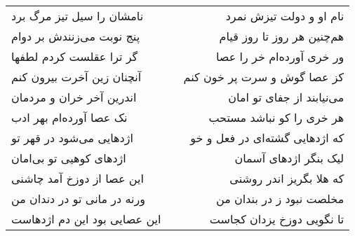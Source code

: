 \begin{center}
\begin{longtable}{l p{0.5cm} r}
نامشان را سیل تیز مرگ برد
&&
نام او و دولت تیزش نمرد
\\
پنج نوبت می‌زنندش بر دوام
&&
هم‌چنین هر روز تا روز قیام
\\
گر ترا عقلست کردم لطفها
&&
ور خری آورده‌ام خر را عصا
\\
آنچنان زین آخرت بیرون کنم
&&
کز عصا گوش و سرت پر خون کنم
\\
اندرین آخر خران و مردمان
&&
می‌نیابند از جفای تو امان
\\
نک عصا آورده‌ام بهر ادب
&&
هر خری را کو نباشد مستحب
\\
اژدهایی می‌شود در قهر تو
&&
که اژدهایی گشته‌ای در فعل و خو
\\
اژدهای کوهیی تو بی‌امان
&&
لیک بنگر اژدهای آسمان
\\
این عصا از دوزخ آمد چاشنی
&&
که هلا بگریز اندر روشنی
\\
ورنه در مانی تو در دندان من
&&
مخلصت نبود ز در بندان من
\\
این عصایی بود این دم اژدهاست
&&
تا نگویی دوزخ یزدان کجاست
\\
\end{longtable}
\end{center}
